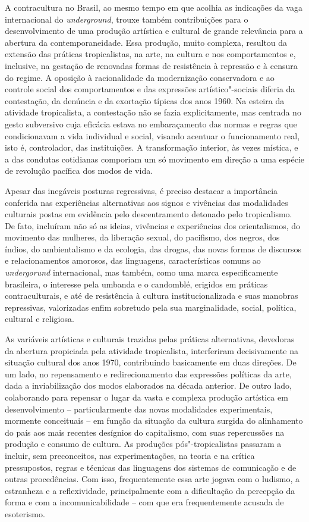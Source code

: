 A contracultura no Brasil, ao mesmo tempo em que acolhia as indicações
da vaga internacional do \emph{underground}, trouxe também contribuições
para o desenvolvimento de uma produção artística e cultural de grande
relevância para a abertura da contemporaneidade. Essa produção, muito
complexa, resultou da extensão das práticas tropicalistas, na arte, na
cultura e nos comportamentos e, inclusive, na gestação de renovadas
formas de resistência à repressão e à censura do regime. A oposição à
racionalidade da modernização conservadora e ao controle social dos
comportamentos e das expressões artístico"-sociais diferia da
contestação, da denúncia e da exortação típicas dos anos 1960. Na
esteira da atividade tropicalista, a contestação não se fazia
explicitamente, mas centrada no gesto subversivo cuja eficácia estava no
embaraçamento das normas e regras que condicionavam a vida individual e
social, visando acentuar o funcionamento real, isto é, controlador, das
instituições. A transformação interior, às vezes mística, e a das
condutas cotidianas comporiam um só movimento em direção a uma espécie
de revolução pacífica dos modos de vida.

Apesar das inegáveis posturas regressivas, é preciso destacar a
importância conferida nas experiências alternativas aos signos e
vivências das modalidades culturais postas em evidência pelo
descentramento detonado pelo tropicalismo. De fato, incluíram não só as
ideias, vivências e experiências dos orientalismos, do movimento das
mulheres, da liberação sexual, do pacifismo, dos negros, dos índios, do
ambientalismo e da ecologia, das drogas, das novas formas de discursos e
relacionamentos amorosos, das linguagens, características comuns ao
\emph{undergorund} internacional, mas também, como uma marca
especificamente brasileira, o interesse pela umbanda e o candomblé,
erigidos em práticas contraculturais, e até de resistência à cultura
institucionalizada e suas manobras repressivas, valorizadas enfim
sobretudo pela sua marginalidade, social, política, cultural e
religiosa.

As variáveis artísticas e culturais trazidas pelas práticas
alternativas, devedoras da abertura propiciada pela atividade
tropicalista, interferiram decisivamente na situação cultural dos anos
1970, contribuindo basicamente em duas direções. De um lado, no
repensamento e redirecionamento das expressões políticas da arte, dada a
inviabilização dos modos elaborados na década anterior. De outro lado,
colaborando para repensar o lugar da vasta e complexa produção artística
em desenvolvimento -- particularmente das novas modalidades
experimentais, mormente conceituais -- em função da situação da cultura
surgida do alinhamento do país aos mais recentes desígnios do
capitalismo, com suas repercussões na produção e consumo de cultura. As
produções pós"-tropicalistas passaram a incluir, sem preconceitos, nas
experimentações, na teoria e na crítica pressupostos, regras e técnicas
das linguagens dos sistemas de comunicação e de outras procedências. Com
isso, frequentemente essa arte jogava com o ludismo, a estranheza e a
reflexividade, principalmente com a dificultação da percepção da forma e
com a incomunicabilidade -- com que era frequentemente acusada de
esoterismo.

